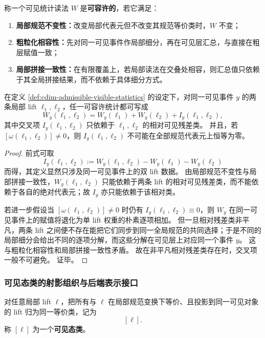 \begin{definition}[可容许的可见统计]\label{def:cdim-admissible-visible-statistics}
称一个可见统计读法 \(W\) 是\textbf{可容许的}，若它满足：
\begin{enumerate}
  \item \textbf{局部规范不变性：}改变局部代表元但不改变其规范等价类时，\(W\) 不变；
  \item \textbf{粗粒化相容性：}先对同一可见事件作局部细分，再在可见层汇总，与直接在粗层赋值一致；
  \item \textbf{局部拼接一致性：}在有限覆盖上，若局部读法在交叠处相容，则汇总值只依赖于其全局拼接结果，而不依赖于具体细分方式。
\end{enumerate}
\end{definition}

\begin{proposition}\label{prop:cdim-multilift-interference-correction}
在定义 \ref{def:cdim-admissible-visible-statistics} 的设定下，对同一可见事件 \(y\) 的两条局部 lift \(\ell_1,\ell_2\)，任一可容许统计都可写成
\[
W_y(\ell_1,\ell_2)
=
W_y(\ell_1)+W_y(\ell_2)+I_y(\ell_1,\ell_2),
\]
其中交叉项 \(I_y(\ell_1,\ell_2)\) 只依赖于 \(\ell_1,\ell_2\) 的相对可见残差类。
并且，若 \([\omega(\ell_1,\ell_2)]\neq 0\)，则 \(I_y(\ell_1,\ell_2)\) 不可能在全部规范代表元上恒等为零。
\end{proposition}
\begin{proof}
前式可取
\[
I_y(\ell_1,\ell_2)
:=
W_y(\ell_1,\ell_2)-W_y(\ell_1)-W_y(\ell_2)
\]
而得，其定义显然只涉及同一可见事件上的双 lift 数据。
由局部规范不变性与局部拼接一致性，\(W_y(\ell_1,\ell_2)\) 只能依赖于两条 lift 的相对可见残差类，而不能依赖于各自的绝对代表元；故 \(I_y\) 亦只能依赖于该相对类。

若进一步假设当 \([\omega(\ell_1,\ell_2)]\neq 0\) 时仍有 \(I_y(\ell_1,\ell_2)\equiv 0\)，则 \(W_y\) 在同一可见事件上的赋值将退化为单 lift 权重的朴素逐项相加。
但一旦相对残差类非平凡，两条 lift 之间便不存在能把它们同步到同一全局规范的共同选择；于是不同的局部细分会给出不同的逐项分解，而这些分解在可见层上对应同一个事件 \(y\)。
这与粗粒化相容性和局部拼接一致性矛盾。
故在非平凡相对残差类存在时，交叉项一般不可避免。
证毕。
\end{proof}

\subsubsection{可见态类的射影组织与后端表示接口}
\begin{definition}[可见态类]\label{def:cdim-visible-state-class}
对任意局部 lift \(\ell\)，把所有与 \(\ell\) 在局部规范变换下等价、且投影到同一可见对象的 lift 归为同一等价类，记为
\[
[\ell].
\]
称 \([\ell]\) 为一个\textbf{可见态类}。
\end{definition}

